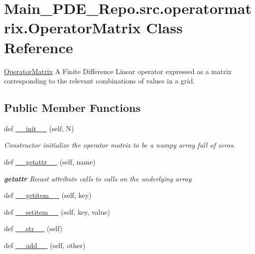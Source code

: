 \hypertarget{classMain__PDE__Repo_1_1src_1_1operatormatrix_1_1OperatorMatrix}{}\section{Main\+\_\+\+P\+D\+E\+\_\+\+Repo.\+src.\+operatormatrix.\+Operator\+Matrix Class Reference}
\label{classMain__PDE__Repo_1_1src_1_1operatormatrix_1_1OperatorMatrix}


\hyperlink{classMain__PDE__Repo_1_1src_1_1operatormatrix_1_1OperatorMatrix}{Operator\+Matrix} A Finite Difference Linear operator expressed as a matrix corresponding to the relevant combinations of values in a grid.  


\subsection*{Public Member Functions}
\begin{DoxyCompactItemize}
\item 
def \hyperlink{classMain__PDE__Repo_1_1src_1_1operatormatrix_1_1OperatorMatrix_a15495a68ab1363574aa90ce186112902}{\+\_\+\+\_\+init\+\_\+\+\_\+} (self, N)
\begin{DoxyCompactList}\small\item\em Constructor initialize the operator matrix to be a numpy array full of zeros. \end{DoxyCompactList}\item 
def \hyperlink{classMain__PDE__Repo_1_1src_1_1operatormatrix_1_1OperatorMatrix_ac0a77d7612e956bee24bdfb07c9b9d13}{\+\_\+\+\_\+getattr\+\_\+\+\_\+} (self, name)
\begin{DoxyCompactList}\small\item\em {\bfseries getattr} Recast attribute calls to calls on the underlying array \end{DoxyCompactList}\item 
def \hyperlink{classMain__PDE__Repo_1_1src_1_1operatormatrix_1_1OperatorMatrix_a1ee9ad94eeb37416c8841c2284ca3a61}{\+\_\+\+\_\+getitem\+\_\+\+\_\+} (self, key)
\item 
def \hyperlink{classMain__PDE__Repo_1_1src_1_1operatormatrix_1_1OperatorMatrix_a10173d65be38d9160d64550d0ff2dfb5}{\+\_\+\+\_\+setitem\+\_\+\+\_\+} (self, key, value)
\item 
def \hyperlink{classMain__PDE__Repo_1_1src_1_1operatormatrix_1_1OperatorMatrix_a81a5bec4032a3c9b195ea1420572a16c}{\+\_\+\+\_\+str\+\_\+\+\_\+} (self)
\item 
def \hyperlink{classMain__PDE__Repo_1_1src_1_1operatormatrix_1_1OperatorMatrix_a2a877f82af8ca1d41d15dcb0a9edc302}{\+\_\+\+\_\+add\+\_\+\+\_\+} (self, other)
\end{DoxyCompactItemize}

